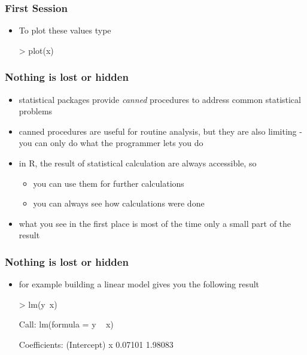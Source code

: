 \documentclass[xcolor={table},c]{beamer}
\begin{document}
\begin{frame}[fragile]\frametitle{First Session}
\begin{itemize}
\item To plot these values type
\begin{semiverbatim}
> plot(x)
\end{semiverbatim}
\begin{center}
\end{center}
\end{itemize}
\end{frame}

\begin{frame}\frametitle{Nothing is lost or hidden}
  \begin{itemize}
    \item statistical packages provide \emph{canned} procedures to address common statistical problems
    \item canned procedures are useful for routine analysis, but they are also limiting - you can only do what the programmer lets you do 
    \item in R, the result of statistical calculation are always accessible, so
      \begin{itemize}
        \item you can use them for further calculations
        \item you can always see how calculations were done
      \end{itemize}
    \item what you see in the first place is most of the time only a small part of the result
  \end{itemize}
\end{frame}


\begin{frame}[fragile]\frametitle{Nothing is lost or hidden}
\begin{itemize}
\item for example building a linear model gives you the following result
\begin{semiverbatim}
> lm(y~x)

Call:
lm(formula = y ~ x)

Coefficients:
(Intercept)            x  
    0.07101      1.98083  
\end{semiverbatim}
\end{itemize}
\end{frame}
\end{document}

